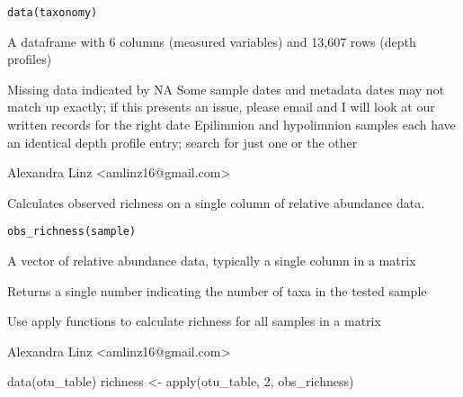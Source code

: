 \documentclass[a4paper]{book}
\begin{document}
%
\begin{Usage}
\begin{verbatim}
data(taxonomy)
\end{verbatim}
\end{Usage}
%
\begin{Format}
A dataframe with 6 columns (measured variables) and 13,607 rows	(depth profiles)
\end{Format}
%
\begin{Details}\relax
Missing data indicated by NA
Some sample dates and metadata dates may not match up exactly; if this presents an issue, please email and I will look at our written records for the right date
Epilimnion and hypolimnion samples each have an identical depth profile entry; search for just one or the other
\end{Details}
%
\begin{Author}\relax
Alexandra Linz <amlinz16@gmail.com>
\end{Author}
%
\begin{Description}\relax
Calculates observed richness on a single column of relative abundance data. 
\end{Description}
%
\begin{Usage}
\begin{verbatim}
obs_richness(sample)
\end{verbatim}
\end{Usage}
%
\begin{Arguments}
\begin{ldescription}
\item[\code{sample}] 
A vector of relative abundance data, typically a single column in a matrix

\end{ldescription}
\end{Arguments}
%
\begin{Value}
Returns a single number indicating the number of taxa in the tested sample
\end{Value}
%
\begin{Note}\relax
Use apply functions to calculate richness for all samples in a matrix

\end{Note}
%
\begin{Author}\relax
Alexandra Linz <amlinz16@gmail.com>
\end{Author}
%
\begin{Examples}
\begin{ExampleCode}
 data(otu_table)
 richness <- apply(otu_table, 2, obs_richness)
\end{ExampleCode}
\end{Examples}
\end{document}
